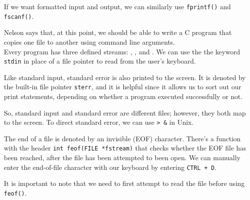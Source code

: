 If we want formatted input and output, we can similarly use \verb!fprintf()! and \verb!fscanf()!. 

Nelson says that, at this point, we should be able to write a C program that copies one file to another using command line arguments. \\

Every program has three defined streams: , , and . We can use the the keyword \verb!stdin! in place of a file pointer to read from the user's keyboard.

Like standard input, standard error is also printed to the screen. It is denoted by the built-in file pointer \verb!sterr!, and it is helpful since it allows us to sort out our print statements, depending on whether a program executed successfully or not. 

So, standard input and standard error are different files; however, they both map to the screen. To direct standard error, we can use \verb!> &! in Unix. 


The end of a file is denoted by an invisible  (EOF) character. There's a function with the header \verb!int feof(FILE *fstream)! that checks whether the EOF file has been reached, after the file has been attempted to been open. We can manually enter the end-of-file character with our keyboard by entering \texttt{CTRL + D}. 


It is important to note that we need to first attempt to read the file before using \verb!feof()!. 


